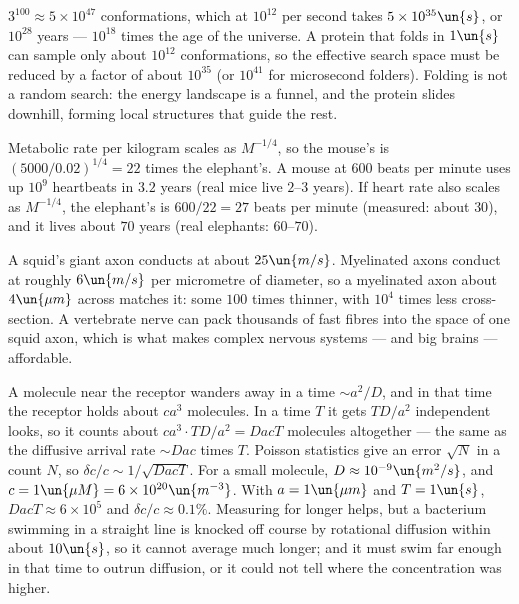  $3^{100}\approx5\times10^{47}$ conformations, which at $10^{12}$ per second takes $5\times10^{35}\un{s}$, or $10^{28}$ years --- $10^{18}$ times the age of the universe. A protein that folds in $1\un{s}$ can sample only about $10^{12}$ conformations, so the effective search space must be reduced by a factor of about $10^{35}$ (or $10^{41}$ for microsecond folders). Folding is not a random search: the energy landscape is a funnel, and the protein slides downhill, forming local structures that guide the rest.

 Metabolic rate per kilogram scales as $M^{-1/4}$, so the mouse's is $(5000/0.02)^{1/4} = 22$ times the elephant's. A mouse at $600$ beats per minute uses up $10^9$ heartbeats in $3.2$ years (real mice live $2$--$3$ years). If heart rate also scales as $M^{-1/4}$, the elephant's is $600/22 = 27$ beats per minute (measured: about $30$), and it lives about $70$ years (real elephants: $60$--$70$).

 A squid's giant axon conducts at about $25\un{m/s}$. Myelinated axons conduct at roughly $6\un{m/s}$ per micrometre of diameter, so a myelinated axon about $4\un{\mu m}$ across matches it: some $100$ times thinner, with $10^4$ times less cross-section. A vertebrate nerve can pack thousands of fast fibres into the space of one squid axon, which is what makes complex nervous systems --- and big brains --- affordable.

 A molecule near the receptor wanders away in a time $\sim a^2/D$, and in that time the receptor holds about $ca^3$ molecules. In a time $T$ it gets $TD/a^2$ independent looks, so it counts about $ca^3\cdot TD/a^2 = DacT$ molecules altogether --- the same as the diffusive arrival rate $\sim Dac$ times $T$. Poisson statistics give an error $\sqrt N$ in a count $N$, so $\delta c/c\sim1/\sqrt{DacT}$. For a small molecule, $D\approx10^{-9}\un{m^2/s}$, and $c = 1\un{\mu M} = 6\times10^{20}\un{m^{-3}}$. With $a = 1\un{\mu m}$ and $T = 1\un{s}$, $DacT\approx6\times10^5$ and $\delta c/c\approx0.1\%$. Measuring for longer helps, but a bacterium swimming in a straight line is knocked off course by rotational diffusion within about $10\un{s}$, so it cannot average much longer; and it must swim far enough in that time to outrun diffusion, or it could not tell where the concentration was higher.


